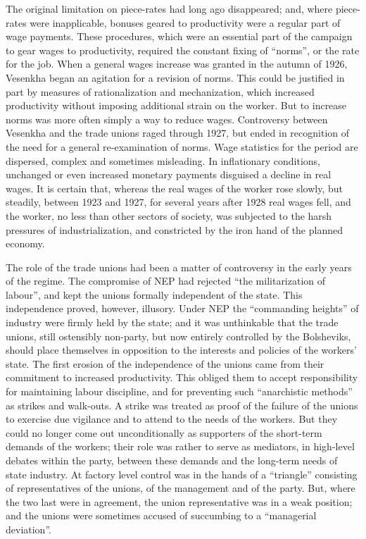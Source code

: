 The original limitation on piece-rates had long ago disappeared; and, where piece-rates were inapplicable, bonuses geared to productivity were a regular part of wage payments. These procedures, which were an essential part of the campaign to gear wages to productivity, required the constant fixing of ``norms'', or the rate for the job. When a general wages increase was granted in the autumn of 1926, Vesenkha began an agitation for a revision of norms. This could be justified in part by measures of rationalization and mechanization, which increased productivity without imposing additional strain on the worker. But to increase norms was more often simply a way to reduce wages. Controversy between Vesenkha and the trade unions raged through 1927, but ended in recognition of the need for a general re-examination of norms. Wage statistics for the period are dispersed, complex and sometimes misleading. In inflationary conditions, unchanged or even increased monetary payments disguised a decline in real wages. It is certain that, whereas the real wages of the worker rose slowly, but steadily, between 1923 and 1927, for several years after 1928 real wages fell, and the worker, no less than other sectors of society, was subjected to the harsh pressures of industrialization, and constricted by the iron hand of the planned economy. 

The role of the trade unions had been a matter of controversy in the early years of the regime. The compromise of NEP had rejected ``the militarization of labour'', and kept the unions formally independent of the state. This independence proved, however, illusory. Under NEP the ``commanding heights'' of industry were firmly held by the state; and it was unthinkable that the trade unions, still ostensibly non-party, but now entirely controlled by the Bolsheviks, should place themselves in opposition to the interests and policies of the workers' state. The first erosion of the independence of the unions came from their commitment to increased productivity. This obliged them to accept responsibility for maintaining labour discipline, and for preventing such ``anarchistic methods'' as strikes and walk-outs. A strike was treated as proof of the failure of the unions to exercise due vigilance and to attend to the needs of the workers. But they could no longer come out unconditionally as supporters of the short-term demands of the workers; their role was rather to serve as mediators, in high-level debates within the party, between these demands and the long-term needs of state industry. At factory level control was in the hands of a ``triangle'' consisting of representatives of the unions, of the management and of the party. But, where the two last were in agreement, the union representative was in a weak position; and the unions were sometimes accused of succumbing to a ``managerial deviation''. 

